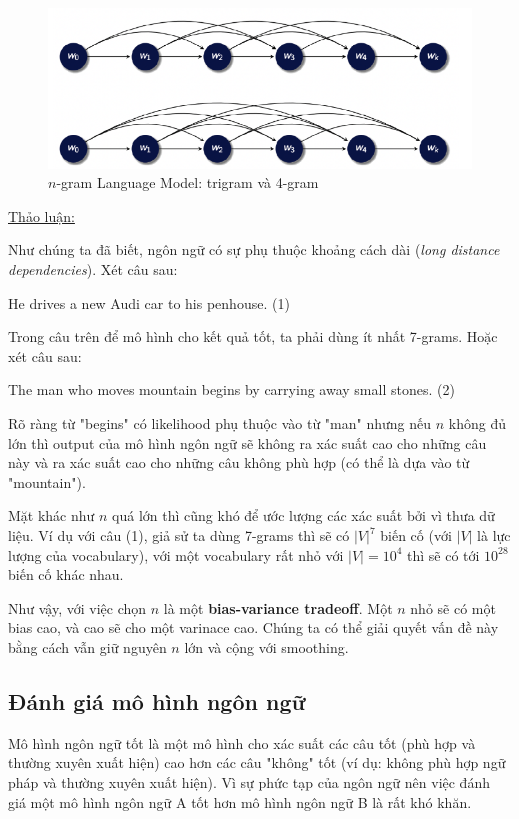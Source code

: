 \begin{figure}[H]
    \centering
    \includegraphics[width=13cm]{chapter07/figure-sec12/ngram.png}
    \caption{$n$-gram Language Model: trigram và 4-gram}
    \label{fig:ngram}
\end{figure}

\underline{Thảo luận:}

Như chúng ta đã biết, ngôn ngữ có sự phụ thuộc khoảng cách dài (\textit{long distance dependencies}). Xét câu sau: 

\begin{center}
He drives a new Audi car to his penhouse. (1)
\end{center}

Trong câu trên để mô hình cho kết quả tốt, ta phải dùng ít nhất 7-grams. Hoặc xét câu sau:
\begin{center}
The man who moves mountain begins by carrying away small stones. (2)
\end{center}    

Rõ ràng từ "begins" có likelihood phụ thuộc vào từ "man" nhưng nếu $n$ không đủ lớn thì output của mô hình ngôn ngữ sẽ không ra xác suất cao cho những câu này và ra xác suất cao cho những câu không phù hợp (có thể là dựa vào từ "mountain").

Mặt khác như $n$ quá lớn thì cũng khó để ước lượng các xác suất bởi vì thưa dữ liệu. Ví dụ với câu (1), giả sử ta dùng 7-grams thì sẽ có $|V|^7$ biến cố (với $|V|$ là lực lượng của vocabulary), với một vocabulary rất nhỏ với $|V|=10^4$ thì sẽ có tới $10^{28}$ biến cố khác nhau.

Như vậy, với việc chọn $n$ là một \textbf{bias-variance tradeoff}. Một $n$ nhỏ sẽ có một bias cao, và cao sẽ cho một varinace cao. Chúng ta có thể giải quyết vấn đề này bằng cách vẫn giữ nguyên $n$ lớn và cộng với smoothing.

\subsection{Đánh giá mô hình ngôn ngữ}
Mô hình ngôn ngữ tốt là một mô hình cho xác suất các câu tốt (phù hợp và thường xuyên xuất hiện) cao hơn các câu "không" tốt (ví dụ: không phù hợp ngữ pháp và thường xuyên xuất hiện). Vì sự phức tạp của ngôn ngữ nên việc đánh giá một mô hình ngôn ngữ A tốt hơn mô hình ngôn ngữ B là rất khó khăn.


